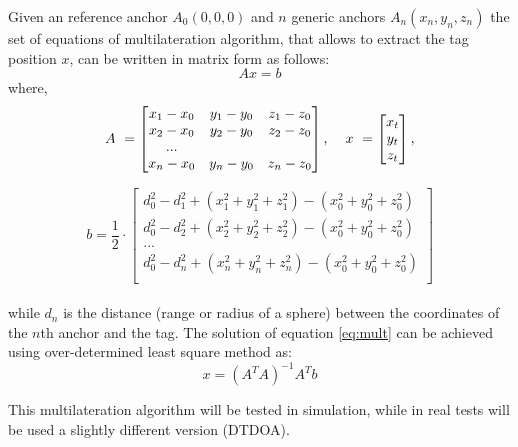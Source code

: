 \documentclass[journal]{IEEEtran}
\begin{document}
Given an reference anchor $A_0(0,0,0)$ and $n$ generic anchors $A_n(x_n,y_n,z_n)$ the set of equations of multilateration algorithm, that allows to extract the tag position $x$, can be written in matrix form as follows:
\begin{equation}
    Ax = b
    \label{eq:mult}
\end{equation}
\noindent
where, 
\begin{equation*}
    A \ =  \begin{bmatrix}
      x_1 - x_0 & y_1 - y_0 & z_1 - z_0 \\
      x_2 - x_0 & y_2 - y_0 & z_2 - z_0 \\
           ... \\
      x_n - x_0 & y_n - y_0 & z_n - z_0 \\
      
    \end{bmatrix}, \hspace{0.4cm} x \ =  \begin{bmatrix}
        x_t \\ y_t \\ z_t
    \end{bmatrix},
\end{equation*}

\begin{equation*}
        b =  \frac{1}{2} \cdot 
        \begin{bmatrix}
        d_0^2 - d_1^2  + (x_1^2 + y_1^2 + z_1^2) - (x_0^2 + y_0^2 + z_0^2)\\ 
        d_0^2 - d_2^2  + (x_2^2 + y_2^2 + z_2^2) - (x_0^2 + y_0^2 + z_0^2)\\ 
        ... \\
        d_0^2 - d_n^2  + (x_n^2 + y_n^2 + z_n^2) - (x_0^2 + y_0^2 + z_0^2)\\ 
        \end{bmatrix}
\end{equation*} \\
\noindent
while $d_n$ is the distance (range or radius of a sphere) between the coordinates of the $n$th anchor and the tag. The solution of equation \ref{eq:mult} can be achieved using over-determined least square method \cite{uwb_algorithms} as:
\begin{equation}
    x = (A^TA)^{-1}A^Tb
    \label{eq:lstsqr}
\end{equation}

This multilateration algorithm will be tested in simulation, while in real tests will be used a slightly different version (DTDOA).
\end{document}
